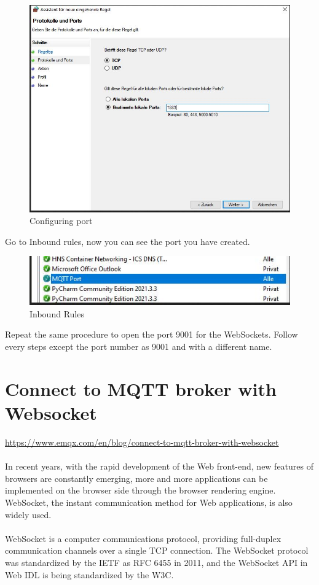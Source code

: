 \documentclass[oneside]{book}
\begin{document}
\begin{figure}[H]
\centering
\includegraphics[scale=.6]{images/Configuring_port.jpg}
\caption{Configuring port}
\end{figure}
 Go to Inbound rules, now you can see the port you have created.
 
\begin{figure}[H]
\centering
\includegraphics[scale=.6]{images/inbound_rules.jpg}
\caption{Inbound Rules}
\end{figure}
Repeat the same procedure to open the port 9001 for the WebSockets. Follow every steps except the port number as 9001 and with a different name.

\section{Connect to MQTT broker with Websocket}
\url{https://www.emqx.com/en/blog/connect-to-mqtt-broker-with-websocket}
\\\\
In recent years, with the rapid development of the Web front-end, new features of browsers are constantly emerging, more and more applications can be implemented on the browser side through the browser rendering engine. WebSocket, the instant communication method for Web applications, is also widely used.
\\\\
WebSocket is a computer communications protocol, providing full-duplex communication channels over a single TCP connection. The WebSocket protocol was standardized by the IETF as RFC 6455 in 2011, and the WebSocket API in Web IDL is being standardized by the W3C.
\end{document}
